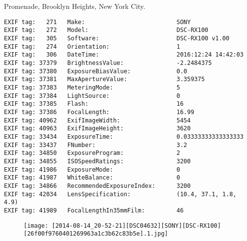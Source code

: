 \section{\protect{}}
\noindent Promenade, Brooklyn Heights, New York City.
\noindent
\begin{lstlisting}
EXIF tag:   271   Make:                          SONY
EXIF tag:   272   Model:                         DSC-RX100
EXIF tag:   305   Software:                      DSC-RX100 v1.00
EXIF tag:   274   Orientation:                   1
EXIF tag:   306   DateTime:                      2016:12:24 14:42:03
EXIF tag: 37379   BrightnessValue:               -2.2484375
EXIF tag: 37380   ExposureBiasValue:             0.0
EXIF tag: 37381   MaxApertureValue:              3.359375
EXIF tag: 37383   MeteringMode:                  5
EXIF tag: 37384   LightSource:                   0
EXIF tag: 37385   Flash:                         16
EXIF tag: 37386   FocalLength:                   16.99
EXIF tag: 40962   ExifImageWidth:                5454
EXIF tag: 40963   ExifImageHeight:               3620
EXIF tag: 33434   ExposureTime:                  0.03333333333333333
EXIF tag: 33437   FNumber:                       3.2
EXIF tag: 34850   ExposureProgram:               2
EXIF tag: 34855   ISOSpeedRatings:               3200
EXIF tag: 41986   ExposureMode:                  0
EXIF tag: 41987   WhiteBalance:                  0
EXIF tag: 34866   RecommendedExposureIndex:      3200
EXIF tag: 42034   LensSpecification:             (10.4, 37.1, 1.8, 4.9)
EXIF tag: 41989   FocalLengthIn35mmFilm:         46

\end{lstlisting}
\clearpage
\begin{figure}
\raggedleft
\texttt{[image: [2014-08-14\_20-52-21][DSC04632][SONY][DSC-RX100][26f00f9760401269963a1c3b62c83b5e].1.jpg]}
\end{figure}


\clearpage
